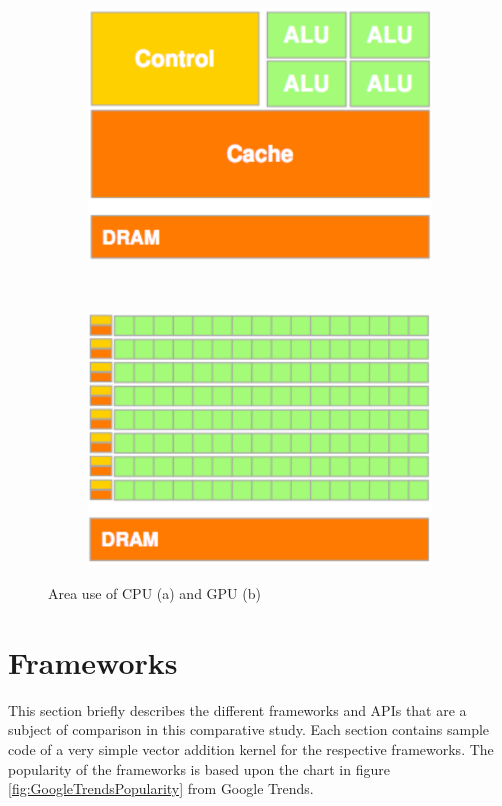 \begin{figure}[!h]
    \centering
    \begin{subfigure}[b]{0.4\textwidth}
        \includegraphics[width=\textwidth]{Theory/Figs/CPUArch.png}
        \caption{}
    \end{subfigure}
    ~ 
    \begin{subfigure}[b]{0.4\textwidth}
        \includegraphics[width=\textwidth]{Theory/Figs/GPUArch.png}
        \caption{}
    \end{subfigure}
    \caption{Area use of CPU (a) and GPU (b)}
    \label{fig:GPUvsCPUArchitecture}
\end{figure}



\section{Frameworks}
This section briefly describes the different frameworks and APIs that are a subject of comparison in this comparative study. Each section contains sample code of a very simple vector addition kernel for the respective frameworks. The popularity of the frameworks is based upon the chart in figure \ref{fig:GoogleTrendsPopularity} from Google Trends.


